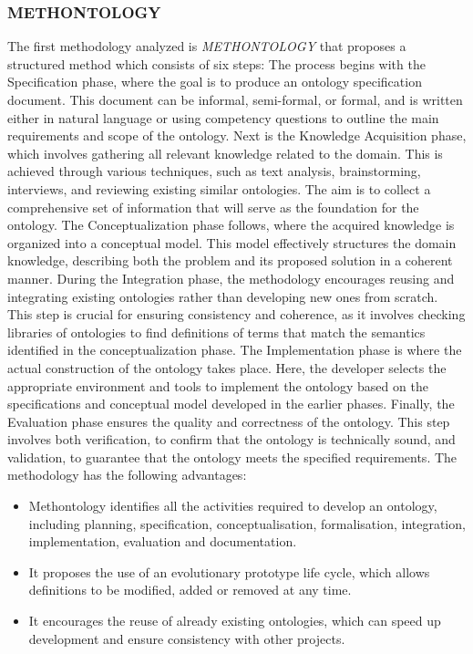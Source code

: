 \subsubsection{METHONTOLOGY}
The first methodology analyzed is \textit{METHONTOLOGY} \cite{fernandez1997ontological} that proposes a structured method which consists of six steps: 
The process begins with the Specification phase, where the goal is to produce an ontology specification document. This document can be informal, semi-formal, or formal, and is written either in natural language or using competency questions to outline the main requirements and scope of the ontology. Next is the Knowledge Acquisition phase, which involves gathering all relevant knowledge related to the domain. This is achieved through various techniques, such as text analysis, brainstorming, interviews, and reviewing existing similar ontologies. The aim is to collect a comprehensive set of information that will serve as the foundation for the ontology. The Conceptualization phase follows, where the acquired knowledge is organized into a conceptual model. This model effectively structures the domain knowledge, describing both the problem and its proposed solution in a coherent manner. During the Integration phase, the methodology encourages reusing and integrating existing ontologies rather than developing new ones from scratch. This step is crucial for ensuring consistency and coherence, as it involves checking libraries of ontologies to find definitions of terms that match the semantics identified in the conceptualization phase. The Implementation phase is where the actual construction of the ontology takes place. Here, the developer selects the appropriate environment and tools to implement the ontology based on the specifications and conceptual model developed in the earlier phases. Finally, the Evaluation phase ensures the quality and correctness of the ontology. This step involves both verification, to confirm that the ontology is technically sound, and validation, to guarantee that the ontology meets the specified requirements. The methodology has the following advantages: 
\begin{itemize}
    \item Methontology identifies all the activities required to develop an ontology, including planning, specification, conceptualisation, formalisation, integration, implementation, evaluation and documentation. 

    \item It proposes the use of an evolutionary prototype life cycle, which allows definitions to be modified, added or removed at any time.

    \item It encourages the reuse of already existing ontologies, which can speed up development and ensure consistency with other projects. 
\end{itemize}

